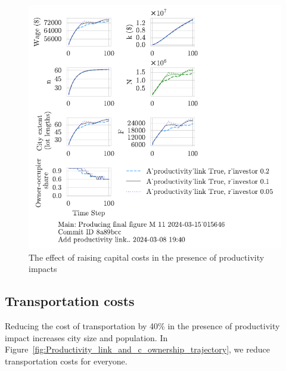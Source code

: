 \begin{figure}[h!t]
    \centering
   \includegraphics[scale=1, trim={0 1.4cm 0 0},clip]{fig/With-productivity_link-r_investor-15_015646.pdf}
    \caption{The effect of raising capital costs in the presence of productivity impacts}
    \label{fig:Productivity_link_and_capital_ownership_trajectory}
\end{figure}

 
\subsection{Transportation costs}
Reducing the cost of transportation by 40\% in the presence of productivity impact increases city size and population. In Figure~\ref{fig:Productivity_link_and_c_ownership_trajectory}, we reduce transportation costs for everyone. 


